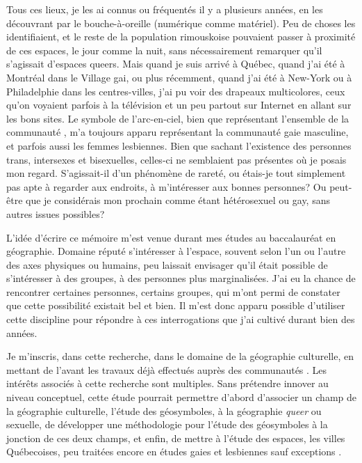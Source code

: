 Tous ces lieux, je les ai connus ou fréquentés il y a plusieurs années, en les découvrant par le bouche-à-oreille (numérique comme matériel).
Peu de choses les identifiaient, et le reste de la population rimouskoise pouvaient passer à proximité de ces espaces, le jour comme la nuit, sans nécessairement remarquer qu'il s'agissait d'espaces queers.
Mais quand je suis arrivé à Québec, quand j'ai été à Montréal dans le Village gai, ou plus récemment, quand j'ai été à New-York ou à Philadelphie dans les centres-villes, j'ai pu voir des drapeaux multicolores, ceux qu'on voyaient parfois à la télévision et un peu partout sur Internet en allant sur les bons sites.
Le symbole de l'arc-en-ciel, bien que représentant l'ensemble de la communauté \lgbt{}, m'a toujours apparu représentant la communauté gaie masculine, et parfois aussi les femmes lesbiennes.
Bien que sachant l'existence des personnes trans, intersexes et bisexuelles, celles-ci ne semblaient pas présentes où je posais mon regard.
S'agissait-il d'un phénomène de rareté, ou étais-je tout simplement pas apte à regarder aux endroits, à m'intéresser aux bonnes personnes?
Ou peut-être que je considérais mon prochain comme étant hétérosexuel ou gay, sans autres issues possibles?

L'idée d'écrire ce mémoire m'est venue durant mes études au baccalauréat en géographie.
Domaine réputé s'intéresser à l'espace, souvent selon l'un ou l'autre des axes physiques ou humains, peu laissait envisager qu'il était possible de s'intéresser à des groupes, à des personnes plus marginalisées.
J'ai eu la chance de rencontrer certaines personnes, certains groupes, qui m'ont permi de constater que cette possibilité existait bel et bien.
Il m'est donc apparu possible d'utiliser cette discipline pour répondre à ces interrogations que j'ai cultivé durant bien des années.

Je m'inscris, dans cette recherche, dans le domaine de la géographie culturelle, en mettant de l'avant les travaux déjà effectués auprès des communautés \lgbt{}.
Les intérêts associés à cette recherche sont multiples.
Sans prétendre innover au niveau conceptuel, cette étude pourrait permettre d'abord d'associer un champ de la géographie culturelle, l'étude des géosymboles, à la géographie \emph{queer} ou sexuelle, de développer une méthodologie pour l'étude des géosymboles à la jonction de ces deux champs, et enfin, de mettre à l'étude des espaces, les villes Québecoises, peu traitées encore en études gaies et lesbiennes sauf exceptions \parencite{Chamberland1993a,Podmore2006,Podmore2001,Hebert2012,Hunt2008,Laprade2014}.

